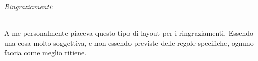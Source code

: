 \myemptypage\newpage
\myemptypage\newpage %
\begin{titlepage}	
\nonumber
\null {}
\begin{flushright}
	\textit{\large Ringraziamenti}: \\
	\ \\
    \begin{minipage}{0.8\textwidth}
    
    		A me personalmente piaceva questo tipo di layout per i ringraziamenti. Essendo una cosa molto soggettiva, e non essendo previste delle regole specifiche, 
    		ognuno faccia come meglio ritiene. 
	\end{minipage}
\end{flushright}

\null
\end{titlepage}
